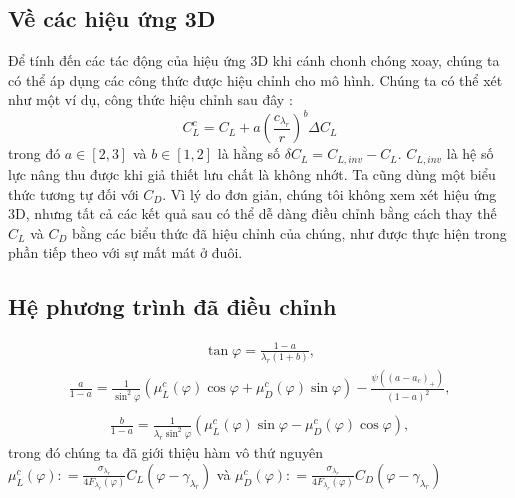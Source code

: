 \documentclass[a4paper,twoside,13pt]{extbook}
\begin{document}
\subsection{Về các hiệu ứng 3D}

Để tính đến các tác động của hiệu ứng 3D khi cánh chonh chóng xoay, chúng ta có thể áp dụng các công thức được hiệu chỉnh cho mô hình. Chúng ta có thể xét như một ví dụ, công thức hiệu chỉnh sau đây :
\[C_L^c = {C_L} + a{\left( {\frac{{{c_{{\lambda _r}}}}}{r}} \right)^b}\Delta {C_L}\]
trong đó $a\in[2,3]$ và $b\in[1,2]$ là hằng số $\delta C_L=C_{L,inv}-C_L$. $C_{L,inv}$ là hệ số lực nâng thu được khi giả thiết lưu chất là không nhớt. Ta cũng dùng một biểu thức tương tự đối với $C_D$. Vì lý do đơn giản, chúng tôi không xem xét hiệu ứng 3D, nhưng tất cả các kết quả sau
có thể dễ dàng điều chỉnh bằng cách thay thế $C_L$ và $C_D$ bằng các biểu thức đã hiệu chỉnh của chúng, như được thực hiện trong phần tiếp theo với sự mất mát ở đuôi.
\subsection{Hệ phương trình đã điều chỉnh}
\begin{equation}\label{eq:1_19}
    \begin{aligned}
        \tan \varphi  = \frac{{1 - a}}{{{\lambda _r}\left( {1 + b} \right)}},
    \end{aligned}
\end{equation}
\begin{equation}\label{eq:1_20}
    \begin{aligned}
        \frac{a}{{1 - a}} = \frac{1}{{{{\sin }^2}\varphi }}\left( {\mu _L^c\left( \varphi  \right)\cos \varphi  + \mu _D^c\left( \varphi  \right)\sin \varphi } \right) - \frac{{\psi \left( {{{\left( {a - {a_c}} \right)}_ + }} \right)}}{{{{\left( {1 - a} \right)}^2}}},\\
    \end{aligned}
\end{equation}
\begin{equation}\label{eq:1_21}
    \begin{aligned}
        \frac{b}{{1 - a}} = \frac{1}{{{\lambda _r}{{\sin }^2}\varphi }}\left( {\mu _L^c\left( \varphi  \right)\sin \varphi  - \mu _D^c\left( \varphi  \right)\cos \varphi } \right),
    \end{aligned}
\end{equation}
trong đó chúng ta đã giới thiệu hàm vô thứ nguyên $\mu _L^c\left( \varphi  \right): = \frac{{{\sigma _{{\lambda _r}}}}}{{4{F_{{\lambda _r}}}\left( \varphi  \right)}}{C_L}\left( {\varphi  - {\gamma _{{\lambda _r}}}} \right)$ và $\mu _D^c\left( \varphi  \right): = \frac{{{\sigma _{{\lambda _r}}}}}{{4{F_{{\lambda _r}}}\left( \varphi  \right)}}{C_D}\left( {\varphi  - {\gamma _{{\lambda _r}}}} \right)$
\end{document}
